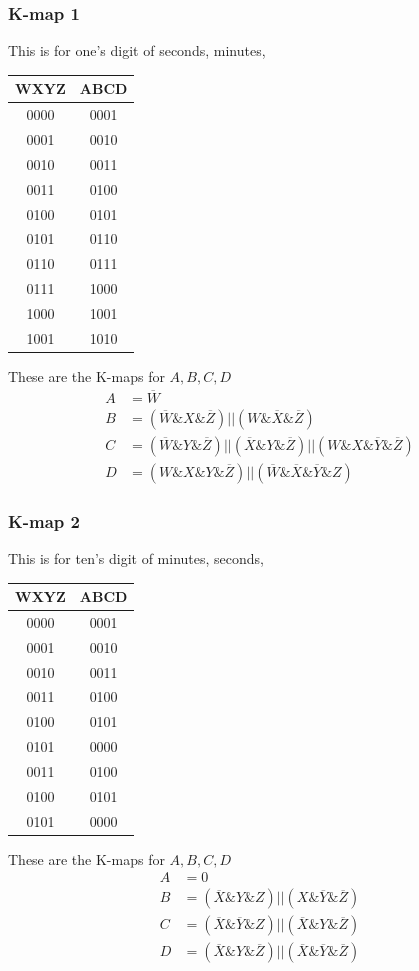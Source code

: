 \documentclass[a4paper,12pt]{article}
\begin{document}
\subsubsection*{K-map 1}
This is for one's digit of seconds, minutes, \newline \newline
\begin{tabular}{|c|c|}
\hline
WXYZ & ABCD \\
\hline
0000 & 0001 \\
0001 & 0010 \\
0010 & 0011 \\
0011 & 0100 \\
0100 & 0101 \\
0101 & 0110 \\
0110 & 0111 \\
0111 & 1000 \\
1000 & 1001 \\
1001 & 1010 \\
\hline
\end{tabular}
\newline
\newline These are the K-maps for $A, B, C, D$
\begin{align*}
A &= \overline{W} \\
B &= (\overline{W} \& X \& \overline{Z})  ||  (W \& \overline{X} \& \overline{Z}) \\
C &= (\overline{W} \& Y \& \overline{Z})  ||  (\overline{X} \& Y \& \overline{Z}) || (W \& X \& \overline{Y} \& \overline{Z}) \\
D &= (W \& X \& Y \& \overline{Z})  ||  (\overline{W} \& \overline{X} \& \overline{Y} \& Z)
\end{align*}
\subsubsection*{K-map 2}
This is for ten's digit of minutes, seconds, \newline \newline
\begin{tabular}{|c|c|}
\hline
WXYZ & ABCD \\
\hline
0000 & 0001 \\
0001 & 0010 \\
0010 & 0011 \\
0011 & 0100 \\
0100 & 0101 \\
0101 & 0000 \\0011 & 0100 \\
0100 & 0101 \\
0101 & 0000 \\
\hline
\end{tabular}
\newline
\newline These are the K-maps for $A, B, C, D$
\begin{align*}
A &= 0 \\
B &= (\overline{X} \& Y \& Z) || (X \& \overline{Y} \& \overline{Z}) \\
C &= (\overline{X} \& \overline{Y} \& Z) || (\overline{X} \& Y \& \overline{Z}) \\
D &= (\overline{X} \& Y \& \overline{Z}) || (\overline{X}\& \overline{Y} \& \overline{Z})
\end{align*}
\end{document}
